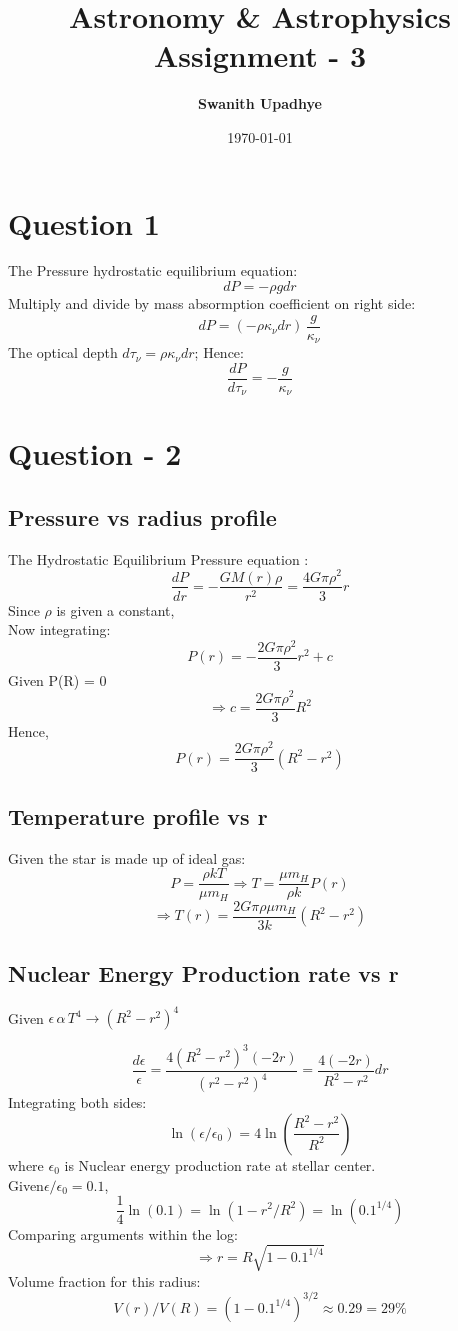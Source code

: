 \documentclass[11pt]{article}
\title{Astronomy \& Astrophysics Assignment - 3}
\author{\textbf{\Large Swanith Upadhye}}
\date{\today}
\begin{document}
	
	\maketitle
	\noindent\hrulefill
	\Large
	
	\section{\color{teal} Question 1}
	
	The Pressure hydrostatic equilibrium equation:
	\[
		dP = -\rho g dr
	\]
	Multiply and divide by mass absormption coefficient on right side:
	\[
		dP = (-\rho \kappa_\nu dr) \, \frac{g}{\kappa_\nu} 
	\]
	The optical depth \(d\tau_\nu  = \rho \kappa_\nu dr\); Hence:
	\[
		\boxed{\frac{dP}{d\tau_\nu} = - \frac{g}{\kappa_\nu}}
	\]
	
	\section{\color{teal}Question - 2}
	
	\subsection{Pressure vs radius profile}
	
	The Hydrostatic Equilibrium Pressure equation :
	\[
		\frac{dP}{dr} = -\frac{GM(r)\rho}{r^2} = \frac{4G\pi\rho^2}{3}r
	\]
	Since $\rho$ is given a constant,\\
	Now integrating:
	\[
		P(r) = -\frac{2G\pi\rho^2}{3}r^2 + c
	\]
	Given P(R) = 0
	\[
		\Rightarrow c = \frac{2G\pi\rho^2}{3}R^2
	\]
	Hence,
	\[
		\boxed{P(r) = \frac{2G\pi\rho^2}{3}(R^2-r^2)}
	\]
	\subsection{Temperature profile vs r}
	
	Given the star is made up of ideal gas:
	\[
		P = \frac{\rho kT}{\mu m_H} \Rightarrow T = \frac{\mu m_H}{\rho k}P(r) 
	\]
	\[
		\Rightarrow \boxed{T(r) = \frac{2G\pi\rho\mu m_H}{3k}(R^2-r^2)}
	\]
	\subsection{Nuclear Energy Production rate vs r}
	
	Given \(\epsilon \, \alpha \, T^4 \rightarrow (R^2 - r^2)^4\)
	
	\[
		\frac{d\epsilon}{\epsilon} = \frac{4(R^2-r^2)^3 (-2r)}{(r^2-r^2)^4} = \frac{4(-2r)}{R^2-r^2}dr
	\]
	Integrating both sides:
	\[
		\ln(\epsilon/\epsilon_0) = 4\ln(\frac{R^2-r^2}{R^2})
	\]
	where $\epsilon_0$ is Nuclear energy production rate at stellar center.\\
	Given$\epsilon/\epsilon_0 = 0.1$,
	\[
		\frac{1}{4}\ln(0.1) = \ln(1-r^2/R^2) = \ln(0.1^{1/4})
	\]
	Comparing arguments within the log:
	\[
		\Rightarrow r = R\sqrt{1-0.1^{1/4}}
	\]
	Volume fraction for this radius:
	\[
		\boxed{V(r)/V(R) = (1-0.1^{1/4})^{3/2} \approx 0.29 =29 \%}
	\]
	
\end{document}
